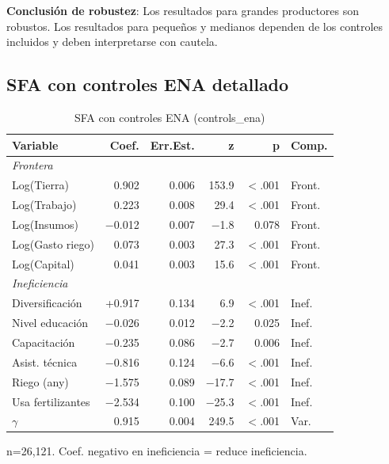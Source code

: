 \documentclass[11pt,a4paper]{article}
\begin{document}
\textbf{Conclusión de robustez}: Los resultados para grandes productores son robustos. Los resultados para pequeños y medianos dependen de los controles incluidos y deben interpretarse con cautela.

\subsection{SFA con controles ENA detallado}

\begin{table}[H]
\centering
\caption{SFA con controles ENA (controls\_ena)}
\label{tab:sfa_controls_ena}
\begin{threeparttable}
\small
\begin{tabular}{lrrrrl}
\toprule
\textbf{Variable} & \textbf{Coef.} & \textbf{Err.Est.} & \textbf{z} & \textbf{p} & \textbf{Comp.} \\
\midrule
\multicolumn{6}{l}{\textit{Frontera}} \\
Log(Tierra) & 0.902 & 0.006 & 153.9 & $<$.001 & Front. \\
Log(Trabajo) & 0.223 & 0.008 & 29.4 & $<$.001 & Front. \\
Log(Insumos) & $-$0.012 & 0.007 & $-$1.8 & 0.078 & Front. \\
Log(Gasto riego) & 0.073 & 0.003 & 27.3 & $<$.001 & Front. \\
Log(Capital) & 0.041 & 0.003 & 15.6 & $<$.001 & Front. \\
\midrule
\multicolumn{6}{l}{\textit{Ineficiencia}} \\
Diversificación & +0.917 & 0.134 & 6.9 & $<$.001 & Inef. \\
Nivel educación & $-$0.026 & 0.012 & $-$2.2 & 0.025 & Inef. \\
Capacitación & $-$0.235 & 0.086 & $-$2.7 & 0.006 & Inef. \\
Asist. técnica & $-$0.816 & 0.124 & $-$6.6 & $<$.001 & Inef. \\
Riego (any) & $-$1.575 & 0.089 & $-$17.7 & $<$.001 & Inef. \\
Usa fertilizantes & $-$2.534 & 0.100 & $-$25.3 & $<$.001 & Inef. \\
\midrule
$\gamma$ & 0.915 & 0.004 & 249.5 & $<$.001 & Var. \\
\bottomrule
\end{tabular}
\begin{tablenotes}
\footnotesize
\item n=26,121. Coef. negativo en ineficiencia = reduce ineficiencia.
\end{tablenotes}
\end{threeparttable}
\end{table}
\end{document}
